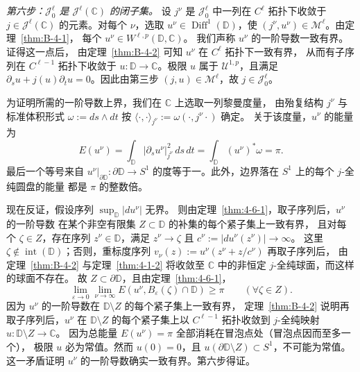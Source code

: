 \emph{第六步：$\mathcal J^\ell_0$ 是 $\mathcal J^\ell(\mathbb C)$ 的闭子集。}
设 $j^\nu$ 是 $\mathcal J^\ell_0$ 中一列在 $C^\ell$ 拓扑下收敛于
$j\in\mathcal J^\ell(\mathbb C)$ 的元素。对每个 $\nu$，选取
$u^\nu\in\operatorname{Diff}^1(\mathbb D)$，使
$(j^\nu,u^\nu)\in\mathcal M^\ell$。由定理~\ref{thm:B-4-1}，
每个 $u^\nu\in W^{\ell,p}(\mathbb D,\mathbb C)$。
我们声称 $u^\nu$ 的一阶导数一致有界。证得这一点后，
由定理~\ref{thm:B-4-2} 可知 $u^\nu$ 在 $C^\ell$ 拓扑下一致有界，
从而有子序列在 $C^{\ell-1}$ 拓扑下收敛于
$u:\mathbb D\to\mathbb C$。极限 $u$ 属于 $\mathcal U^{1,p}$，且满足
$\partial_su+j(u)\partial_tu=0$。因此由第三步
$(j,u)\in\mathcal M^\ell$，故 $j\in\mathcal J^\ell_0$。

为证明所需的一阶导数上界，我们在 $\mathbb C$ 上选取一列黎曼度量，
由殆复结构 $j^\nu$ 与标准体积形式 $\omega:=ds\wedge dt$ 按
$\langle\cdot,\cdot\rangle_{j^\nu}:=\omega(\cdot,j^\nu\cdot)$ 确定。
关于该度量，$u^\nu$ 的能量为
\[
  E(u^\nu)=\int_{\mathbb D}|\partial_su^\nu|^2_{j^\nu}\,ds\,dt
    =\int_{\mathbb D}(u^\nu)^*\omega=\pi.
\]
最后一个等号来自 $u^\nu|_{\partial\mathbb D}:\partial\mathbb D\to S^1$
的度等于一。此外，边界落在 $S^1$ 上的每个 $j$-全纯圆盘的能量
都是 $\pi$ 的整数倍。

现在反证，假设序列 $\sup_{\mathbb D}|du^\nu|$ 无界。
则由定理~\ref{thm:4-6-1}，取子序列后，$u^\nu$ 的一阶导数
在某个非空有限集 $Z\subset\mathbb D$ 的补集的每个紧子集上一致有界，
且对每个 $\zeta\in Z$，存在序列 $z^\nu\in\mathbb D$，满足
$z^\nu\to\zeta$ 且 $c^\nu:=|du^\nu(z^\nu)|\to\infty$。
这里 $\zeta\notin\operatorname{int}(\mathbb D)$；否则，重标度序列
$v_\nu(z):=u^\nu(z^\nu+z/c^\nu)$ 再取子序列后，
由定理~\ref{thm:B-4-2} 与定理~\ref{thm:4-1-2} 将收敛至
$\mathbb C$ 中的非恒定 $j$-全纯球面，而这样的球面不存在。
故 $Z\subset\partial\mathbb D$，且由定理~\ref{thm:4-6-1}，
\[
  \lim_{\varepsilon\to0}\lim_{\nu\to\infty}
  E(u^\nu,B_\varepsilon(\zeta)\cap\mathbb D)\ge\pi
  \qquad(\forall\zeta\in Z).
\]
因为 $u^\nu$ 的一阶导数在 $\mathbb D\setminus Z$ 的每个紧子集上一致有界，
定理~\ref{thm:B-4-2} 说明再取子序列后，$u^\nu$ 在
$\mathbb D\setminus Z$ 的每个紧子集上以 $C^{\ell-1}$ 拓扑收敛到
$j$-全纯映射 $u:\mathbb D\setminus Z\to\mathbb C$。
因为总能量 $E(u^\nu)=\pi$ 全部消耗在冒泡点处（冒泡点因而至多一个），
极限 $u$ 必为常值。然而 $u(0)=0$，且
$u(\partial\mathbb D\setminus Z)\subset S^1$，不可能为常值。
这一矛盾证明 $u^\nu$ 的一阶导数确实一致有界。第六步得证。

